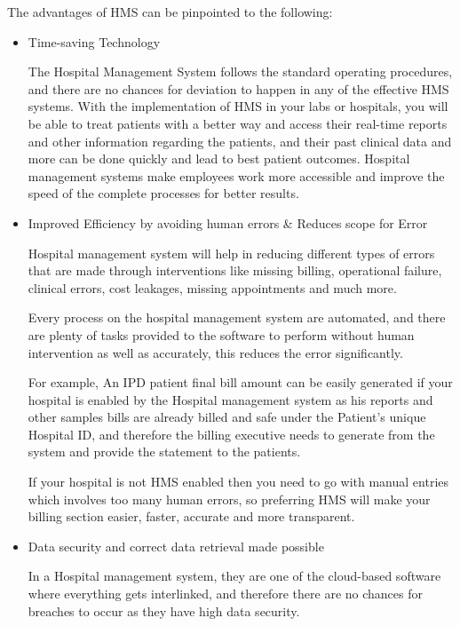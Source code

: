 \documentclass[a4paper, 14pt]{report}
\begin{document}
{The advantages of HMS can be pinpointed to the following:\\
\begin{itemize}
    \item Time-saving Technology
 
The Hospital Management System follows the standard operating procedures, and there are no chances for deviation to happen in any of the effective HMS systems. With the implementation of HMS in your labs or hospitals, you will be able to treat patients with a better way and access their real-time reports and other information regarding the patients, and their past clinical data and more can be done quickly and lead to best patient outcomes. Hospital management systems make employees work more accessible and improve the speed of the complete processes for better results.\\

    \item Improved Efficiency by avoiding human errors & Reduces scope for Error
 
Hospital management system will help in reducing different types of errors that are made through interventions like missing billing, operational failure, clinical errors, cost leakages, missing appointments and much more.
 
Every process on the hospital management system are automated, and there are plenty of tasks provided to the software to perform without human intervention as well as accurately, this reduces the error significantly.
 
For example, An IPD patient final bill amount can be easily generated if your hospital is enabled by the Hospital management system as his reports and other samples bills are already billed and safe under the Patient's unique Hospital ID, and therefore the billing executive needs to generate from the system and provide the statement to the patients.
 
If your hospital is not HMS enabled then you need to go with manual entries which involves too many human errors, so preferring HMS will make your billing section easier, faster, accurate and more transparent.\\

    \item Data security and correct data retrieval made possible
 
In a Hospital management system, they are one of the cloud-based software where everything gets interlinked, and therefore there are no chances for breaches to occur as they have high data security.
 

\end{itemize}}
\end{document}
